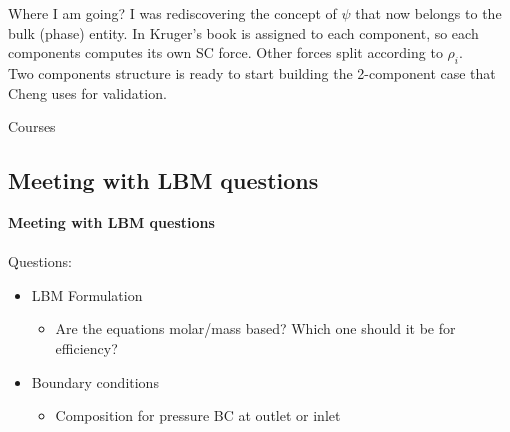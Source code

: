 \documentclass{beamer}
\begin{document}
	\begin{frame}{Where I am going?}
		I was rediscovering the concept of $\psi$ that now belongs to the bulk (phase) entity. In Kruger's book is assigned to each component, so each components computes its own SC force. Other forces split according to $\rho_i$.\\
		Two components structure is ready to start building the 2-component case that Cheng uses for validation. 
	\end{frame}
	\begin{frame}{Courses}
	\end{frame}
	
	\subsection{Meeting with LBM questions}
	\label{}
	\justifying
	\begin{frame}
		\textbf{Meeting with LBM questions}\\~\\
		Questions:
		\begin{itemize}
			\item LBM Formulation
			\begin{itemize}
				\item Are the equations molar/mass based? Which one should it be for efficiency?
			\end{itemize}
			\item Boundary conditions
			\begin{itemize}
				\item Composition for pressure BC at outlet or inlet
			\end{itemize}
		\end{itemize}
	\end{frame}
	
	
	
\end{document}
